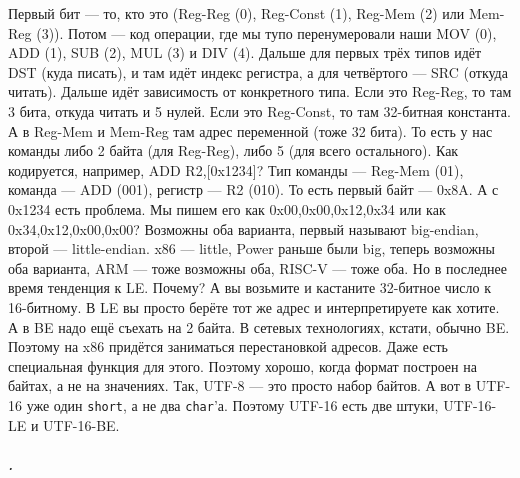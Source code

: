\documentclass{article}
\begin{document}
    Первый бит --- то, кто это (Reg-Reg (0), Reg-Const (1), Reg-Mem (2) или Mem-Reg (3)). Потом --- код операции, где мы тупо перенумеровали наши MOV (0), ADD (1), SUB (2), MUL (3) и DIV (4). Дальше для первых трёх типов идёт DST (куда писать), и там идёт индекс регистра, а для четвёртого --- SRC (откуда читать). Дальше идёт зависимость от конкретного типа. Если это Reg-Reg, то там 3 бита, откуда читать и 5 нулей. Если это Reg-Const, то там 32-битная константа. А в Reg-Mem и Mem-Reg там адрес переменной (тоже 32 бита). То есть у нас команды либо 2 байта (для Reg-Reg), либо 5 (для всего остального). Как кодируется, например, ADD R2,[0x1234]? Тип команды --- Reg-Mem (01), команда --- ADD (001), регистр --- R2 (010). То есть первый байт --- 0x8A. А с 0x1234 есть проблема. Мы пишем его как 0x00,0x00,0x12,0x34 или как 0x34,0x12,0x00,0x00? Возможны оба варианта, первый называют big-endian, второй --- little-endian. x86 --- little, Power раньше были big, теперь возможны оба варианта, ARM --- тоже возможны оба, RISC-V --- тоже оба. Но в последнее время тенденция к LE. Почему? А вы возьмите и кастаните 32-битное число к 16-битному. В LE вы просто берёте тот же адрес и интерпретируете как хотите. А в BE надо ещё съехать на 2 байта. В сетевых технологиях, кстати, обычно BE. Поэтому на x86 придётся заниматься перестановкой адресов. Даже есть специальная функция для этого. Поэтому хорошо, когда формат построен на байтах, а не на значениях. Так, UTF-8 --- это просто набор байтов. А вот в UTF-16 уже один \texttt{short}, а не два \texttt{char}'а. Поэтому UTF-16 есть две штуки, UTF-16-LE и UTF-16-BE.
    \subparagraph{.}
\end{document}
